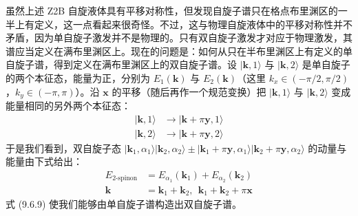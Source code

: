

虽然上述 Z2B 自旋液体具有平移对称性，但发现自旋子谱只在格点布里渊区的一半上有定义，这一点看起来很奇怪。不过，这与物理自旋液体中的平移对称性并不矛盾，因为单自旋子激发并不是物理的。只有双自旋子激发才对应于物理激发，其谱应当定义在满布里渊区上。现在的问题是：如何从只在半布里渊区上有定义的单自旋子谱，得到定义在满布里渊区上的双自旋子谱。设 $|\pmb{k},1\rangle$ 与 $|\pmb{k},2\rangle$ 是单自旋子的两个本征态，能量为正，分别为 $E_1(\pmb{k})$ 与 $E_2(\pmb{k})$（这里 $k_x\in(-\pi/2,\pi/2)$，$k_y\in(-\pi,\pi)$）。沿 $\pmb{x}$ 的平移（随后再作一个规范变换）把 $|\pmb{k},1\rangle$ 与 $|\pmb{k},2\rangle$ 变成能量相同的另外两个本征态：
\begin{equation*}
\begin{aligned}
|\pmb{k},1\rangle &\to |\pmb{k}+\pi\pmb{y},1\rangle \\
|\pmb{k},2\rangle &\to |\pmb{k}+\pi\pmb{y},2\rangle
\end{aligned}
\end{equation*}
于是我们看到，双自旋子态 $|\pmb{k}_1,\alpha_1\rangle|\pmb{k}_2,\alpha_2\rangle\pm|\pmb{k}_1+\pi\pmb{y},\alpha_1\rangle|\pmb{k}_2+\pi\pmb{y},\alpha_2\rangle$ 的动量与能量由下式给出：
\begin{equation*}
\begin{aligned}
E_{2\text{-spinon}} &= E_{\alpha_1}(\pmb{k}_1)+E_{\alpha_2}(\pmb{k}_2) \\
\pmb{k} &= \pmb{k}_1+\pmb{k}_2,\ \ \pmb{k}_1+\pmb{k}_2+\pi\pmb{x}
\end{aligned}
\tag{9.6.9}
\end{equation*}
式 (9.6.9) 使我们能够由单自旋子谱构造出双自旋子谱。

